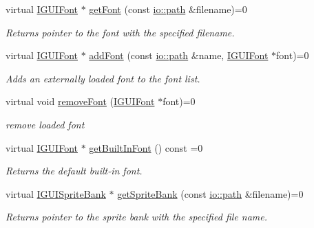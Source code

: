 \begin{DoxyCompactItemize}
virtual \hyperlink{classirr_1_1gui_1_1IGUIFont}{I\+G\+U\+I\+Font} $\ast$ \hyperlink{classirr_1_1gui_1_1IGUIEnvironment_a22074f9a1a5a86d5d216126bbb90b3b1}{get\+Font} (const \hyperlink{namespaceirr_1_1io_a6468281622ce3a1c46b72e19f32dded5}{io\+::path} \&filename)=0
\begin{DoxyCompactList}\small\item\em Returns pointer to the font with the specified filename. \end{DoxyCompactList}\item 
virtual \hyperlink{classirr_1_1gui_1_1IGUIFont}{I\+G\+U\+I\+Font} $\ast$ \hyperlink{classirr_1_1gui_1_1IGUIEnvironment_a2c4fefb8a67fc92aedbbff6254532c2b}{add\+Font} (const \hyperlink{namespaceirr_1_1io_a6468281622ce3a1c46b72e19f32dded5}{io\+::path} \&name, \hyperlink{classirr_1_1gui_1_1IGUIFont}{I\+G\+U\+I\+Font} $\ast$font)=0
\begin{DoxyCompactList}\small\item\em Adds an externally loaded font to the font list. \end{DoxyCompactList}\item 
\mbox{\label{classirr_1_1gui_1_1IGUIEnvironment_a414f61b6901e7328448247648fdf9375}} 
virtual void \hyperlink{classirr_1_1gui_1_1IGUIEnvironment_a414f61b6901e7328448247648fdf9375}{remove\+Font} (\hyperlink{classirr_1_1gui_1_1IGUIFont}{I\+G\+U\+I\+Font} $\ast$font)=0
\begin{DoxyCompactList}\small\item\em remove loaded font \end{DoxyCompactList}\item 
virtual \hyperlink{classirr_1_1gui_1_1IGUIFont}{I\+G\+U\+I\+Font} $\ast$ \hyperlink{classirr_1_1gui_1_1IGUIEnvironment_a896fbfcbad5ccf187a835827b439da93}{get\+Built\+In\+Font} () const =0
\begin{DoxyCompactList}\small\item\em Returns the default built-\/in font. \end{DoxyCompactList}\item 
virtual \hyperlink{classirr_1_1gui_1_1IGUISpriteBank}{I\+G\+U\+I\+Sprite\+Bank} $\ast$ \hyperlink{classirr_1_1gui_1_1IGUIEnvironment_a187ebb28837dbdb88810f7e493096c3f}{get\+Sprite\+Bank} (const \hyperlink{namespaceirr_1_1io_a6468281622ce3a1c46b72e19f32dded5}{io\+::path} \&filename)=0
\begin{DoxyCompactList}\small\item\em Returns pointer to the sprite bank with the specified file name. \end{DoxyCompactList}\item 

\end{DoxyCompactItemize}

